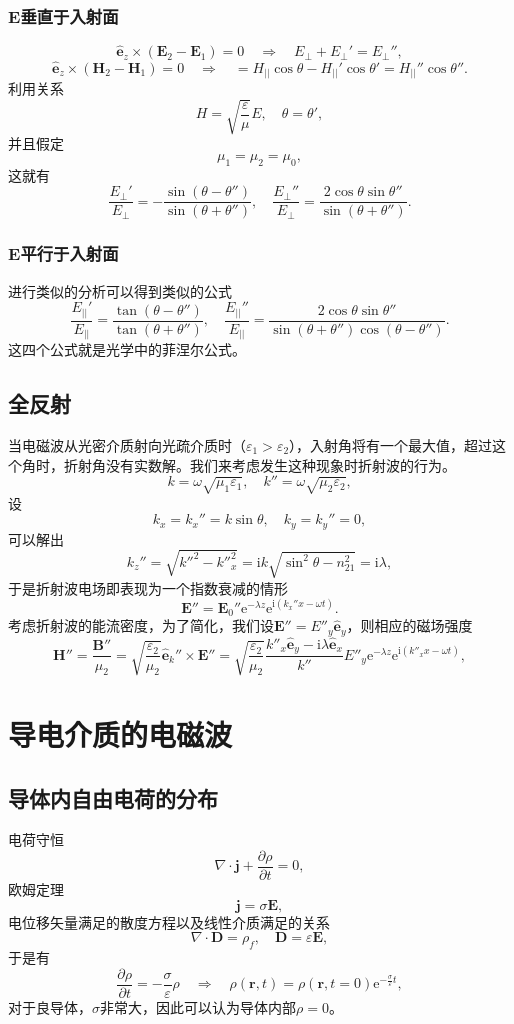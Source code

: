 \documentclass[UTF8]{ctexbook}
\newcommand{\e}{\mathrm{e}}
\renewcommand{\b}{\boldsymbol}
\renewcommand{\i}{\mathrm{i}}
\numberwithin{equation}{chapter}
\begin{document}
	\subsubsection{$\b{E}$垂直于入射面}
	\[\hat{\b{e}}_z\times(\b{E}_2-\b{E}_1)=0\quad\Rightarrow \quad E_{\perp}+E_{\perp}'=E_{\perp}'',\]
	\[\hat{\b{e}}_z\times(\b{H}_2-\b{H}_1)=0\quad\Rightarrow \quad=H_{||}\cos\theta-H_{||}'\cos\theta'=H_{||}''\cos\theta''.\]
	利用关系
	\[H=\sqrt{\frac{\varepsilon}{\mu}}E,\quad \theta=\theta',\]
	并且假定
	\[\mu_1=\mu_2=\mu_0,\]
	这就有
	\[\frac{E_{\perp}'}{E_{\perp}}=-\frac{\sin(\theta-\theta'')}{\sin(\theta+\theta'')},\quad \frac{E_{\perp}''}{E_{\perp}}=\frac{2\cos\theta\sin\theta''}{\sin(\theta+\theta'')}.\]
	
	\subsubsection{$\b{E}$平行于入射面}
	进行类似的分析可以得到类似的公式
	\[\frac{E_{||}'}{E_{||}}=\frac{\tan(\theta-\theta'')}{\tan(\theta+\theta'')},\quad \frac{E_{||}''}{E_{||}}=\frac{2\cos\theta\sin\theta''}{\sin(\theta+\theta'')\cos(\theta-\theta'')}.\]
	这四个公式就是光学中的菲涅尔公式。
	
	\subsection{全反射}
	当电磁波从光密介质射向光疏介质时（$\varepsilon_1>\varepsilon_2$），入射角将有一个最大值，超过这个角时，折射角没有实数解。我们来考虑发生这种现象时折射波的行为。
	\[k=\omega\sqrt{\mu_1\varepsilon_1},\quad k''=\omega\sqrt{\mu_2\varepsilon_2},\]
	设
	\[k_x=k_x''=k\sin\theta,\quad k_y=k_y''=0,\]
	可以解出
	\[k_z''=\sqrt{k''^2-k''^2_x}=\i k\sqrt{\sin^2\theta-n_{21}^2}=\i\lambda,\]
	于是折射波电场即表现为一个指数衰减的情形
	\[\b{E}''=\b{E}_0''\e^{-\lambda z}\e^{\i(k_x'' x-\omega t)}.\]
	考虑折射波的能流密度，为了简化，我们设$\b{E}''=E''_y\hat{\b{e}}_y$，则相应的磁场强度
	\[\b{H}''=\frac{\b{B}''}{\mu_2}=\sqrt{\frac{\varepsilon_2}{\mu_2}}\hat{\b{e}}_k''\times\b{E}''=\sqrt{\frac{\varepsilon_2}{\mu_2}}\frac{k''_x\hat{\b{e}}_y-\i\lambda\hat{\b{e}}_x}{k''}E''_y\e^{-\lambda z}\e^{\i(k''_x x-\omega t)},\]
	
	\section{导电介质的电磁波}
	\subsection{导体内自由电荷的分布}
	电荷守恒
	\[\nabla\cdot\b{j}+\frac{\partial \rho}{\partial t}=0,\]
	欧姆定理
	\[\b{j}=\sigma\b{E},\]
	电位移矢量满足的散度方程以及线性介质满足的关系
	\[\nabla\cdot\b{D}=\rho_f,\quad \b{D}=\varepsilon\b{E},\]
	于是有
	\[\frac{\partial \rho}{\partial t}=-\frac{\sigma}{\varepsilon}\rho\quad\Rightarrow \quad \rho(\b{r},t)=\rho(\b{r},t=0)\e^{-\frac{\sigma}{\varepsilon}t},\]
	对于良导体，$\sigma$非常大，因此可以认为导体内部$\rho=0$。
	
\end{document}
